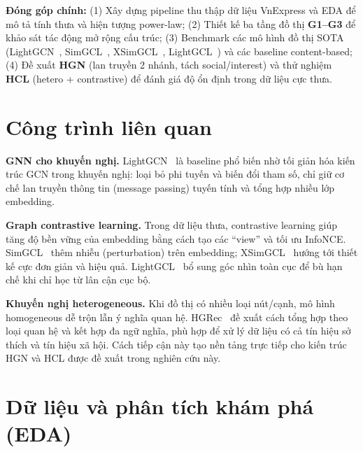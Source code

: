 \documentclass[11pt]{article}
\begin{document}
\noindent\textbf{Đóng góp chính:}
(1) Xây dựng pipeline thu thập dữ liệu VnExpress và EDA để mô tả tính thưa và hiện tượng power-law;
(2) Thiết kế ba tầng đồ thị \textbf{G1--G3} để khảo sát tác động mở rộng cấu trúc;
(3) Benchmark các mô hình đồ thị SOTA (LightGCN~\citep{he2020lightgcn}, SimGCL~\citep{yu2022graph}, XSimGCL~\citep{yu2023xsimgcl}, LightGCL~\citep{cai2023lightgcl}) và các baseline content-based;
(4) Đề xuất \textbf{HGN} (lan truyền 2 nhánh, tách social/interest) và thử nghiệm \textbf{HCL} (hetero + contrastive) để đánh giá độ ổn định trong dữ liệu cực thưa.

\section{Công trình liên quan}
\label{sec:related}

\textbf{GNN cho khuyến nghị.}
LightGCN~\citep{he2020lightgcn} là baseline phổ biến nhờ tối giản hóa kiến trúc GCN trong khuyến nghị: loại bỏ phi tuyến và biến đổi tham số, chỉ giữ cơ chế lan truyền thông tin (message passing) tuyến tính và tổng hợp nhiều lớp embedding.

\textbf{Graph contrastive learning.}
Trong dữ liệu thưa, contrastive learning giúp tăng độ bền vững của embedding bằng cách tạo các ``view'' và tối ưu InfoNCE. SimGCL~\citep{yu2022graph} thêm nhiễu (perturbation) trên embedding; XSimGCL~\citep{yu2023xsimgcl} hướng tới thiết kế cực đơn giản và hiệu quả. LightGCL~\citep{cai2023lightgcl} bổ sung góc nhìn toàn cục để bù hạn chế khi chỉ học từ lân cận cục bộ.

\textbf{Khuyến nghị heterogeneous.}
Khi đồ thị có nhiều loại nút/cạnh, mô hình homogeneous dễ trộn lẫn ý nghĩa quan hệ. HGRec~\citep{shi2020hgrec} đề xuất cách tổng hợp theo loại quan hệ và kết hợp đa ngữ nghĩa, phù hợp để xử lý dữ liệu có cả tín hiệu sở thích và tín hiệu xã hội. Cách tiếp cận này tạo nền tảng trực tiếp cho kiến trúc HGN và HCL được đề xuất trong nghiên cứu này.

\section{Dữ liệu và phân tích khám phá (EDA)}
\label{sec:data}
\end{document}

